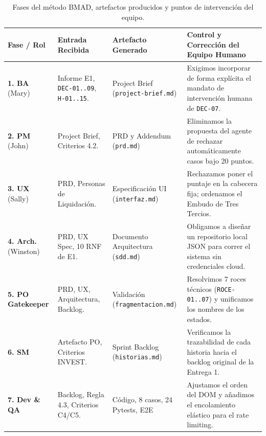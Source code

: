 \documentclass[11pt,letterpaper]{article}
\begin{document}
\begin{table}[h]
\centering
\small
\begin{tabularx}{\textwidth}{l P{3.5cm} P{3.8cm} Y}
\toprule
\textbf{Fase / Rol} & \textbf{Entrada Recibida} & \textbf{Artefacto Generado} & \textbf{Control y Corrección del Equipo Humano} \\
\midrule
\textbf{1. BA} (Mary) & Informe E1, \texttt{DEC-01..09}, \texttt{H-01..15}. & Project Brief (\texttt{project-brief.md}) & Exigimos incorporar de forma explícita el mandato de intervención humana de \texttt{DEC-07}. \\
\textbf{2. PM} (John) & Project Brief, Criterios 4.2. & PRD y Addendum (\texttt{prd.md}) & Eliminamos la propuesta del agente de rechazar automáticamente casos bajo 20 puntos. \\
\textbf{3. UX} (Sally) & PRD, Personas de Liquidación. & Especificación UI (\texttt{interfaz.md}) & Rechazamos poner el puntaje en la cabecera fija; ordenamos el Embudo de Tres Tercios. \\
\textbf{4. Arch.} (Winston) & PRD, UX Spec, 10 RNF de E1. & Documento Arquitectura (\texttt{sdd.md}) & Obligamos a diseñar un repositorio local JSON para correr el sistema sin credenciales cloud. \\
\textbf{5. PO Gatekeeper} & PRD, UX, Arquitectura, Backlog. & Validación (\texttt{fragmentacion.md}) & Resolvimos 7 roces técnicos (\texttt{ROCE-01..07}) y unificamos los nombres de los estados. \\
\textbf{6. SM} & Artefacto PO, Criterios INVEST. & Sprint Backlog (\texttt{historias.md}) & Verificamos la trazabilidad de cada historia hacia el backlog original de la Entrega 1. \\
\textbf{7. Dev \& QA} & Backlog, Regla 4.3, Criterios C4/C5. & Código, 8 casos, 24 Pytests, E2E & Ajustamos el orden del DOM y añadimos el encolamiento elástico para el rate limiting. \\
\bottomrule
\end{tabularx}
\caption{Fases del método BMAD, artefactos producidos y puntos de intervención del equipo.}
\label{tab:fases-bmad}
\end{table}
\end{document}
